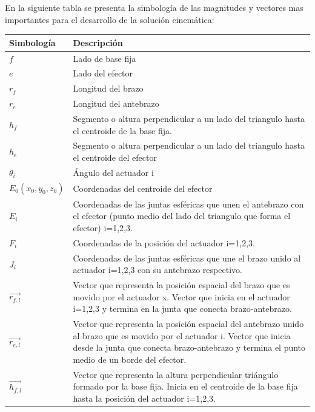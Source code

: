         En la siguiente tabla se presenta la simbología de las magnitudes y vectores mas importantes para el desarrollo de la solución cinemática: 

        \begin{table}[H]
            \centering
            \begin{tabular}{>{\centering\arraybackslash}m{2cm} >{\arraybackslash}m{5cm} }
               Simbología  &  Descripción  \\\hline
               $f$  & Lado de base fija    \\\hline
               $e$  & Lado del efector    \\\hline
               $r_{f}$  & Longitud del brazo    \\\hline
               $r_{e}$  & Longitud del antebrazo    \\\hline
               $h_{f}$  & Segmento o altura perpendicular a un lado del triangulo hasta el centroide de la base fija.     \\\hline
               $h_{e}$  & Segmento o altura perpendicular a un lado del triangulo hasta el centroide del efector         \\\hline
               $\theta_{i}$  & Ángulo del actuador i    \\\hline
               $E_{0}(x_{0},y_{0},z_{0})$  & Coordenadas del centroide del efector   \\\hline
               $E_{i}$  & Coordenadas de las juntas esféricas que unen el antebrazo con el efector (punto medio del lado
               del triangulo que forma el efector) i=1,2,3.    \\\hline
               $F_{i}$  & Coordenadas de la posición del actuador i=1,2,3.    \\\hline
               $J_{i}$  & Coordenadas de las juntas esféricas que une el brazo unido al actuador i=1,2,3 con su antebrazo respectivo.    \\\hline
               $\overrightarrow{r_{f,l}}$  & Vector que representa la posición espacial del brazo que es movido por el actuador x. Vector que inicia en el actuador i=1,2,3 y termina en la junta que conecta brazo-antebrazo.     \\\hline
              $\overrightarrow{r_{e,l}}$  & Vector que representa la posición espacial del antebrazo unido al brazo que es movido por el actuador i. Vector que inicia desde la junta que conecta brazo-antebrazo y termina el punto medio de un borde del efector.    \\\hline
              $\overrightarrow{h_{f,l}}$  & Vector que representa la altura perpendicular triángulo formado por la base fija. Inicia en el centroide de la base fija hasta la posición del actuador i=1,2,3.    \\\hline

\end{tabular}
\end{table}
